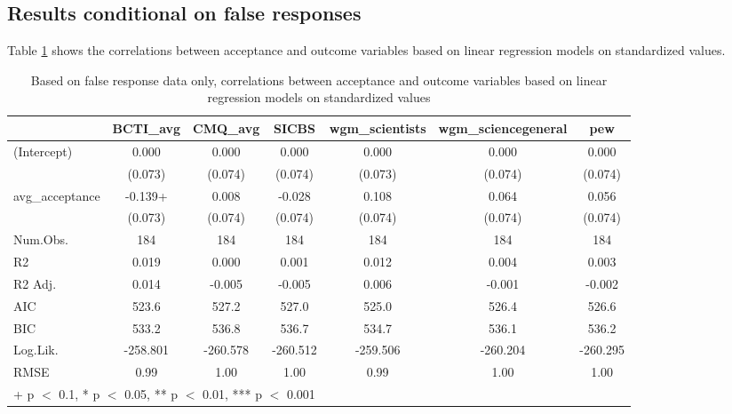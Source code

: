 \documentclass[
  doc,floatsintext]{apa6}
\begin{document}
\hypertarget{results-conditional-on-false-responses}{%
\subsection{Results conditional on false responses}\label{results-conditional-on-false-responses}}

Table \ref{tab:false-response-regression} shows the correlations between acceptance and outcome variables based on linear regression models on standardized values.

\begin{table}

\caption{\label{tab:false-response-regression}Based on false response data only, correlations between acceptance and outcome variables based on linear regression models on standardized values}
\centering
\begin{tabular}[t]{lcccccc}
\toprule
  & BCTI\_avg & CMQ\_avg & SICBS & wgm\_scientists & wgm\_sciencegeneral & pew\\
\midrule
(Intercept) & 0.000 & 0.000 & 0.000 & 0.000 & 0.000 & 0.000\\
 & (0.073) & (0.074) & (0.074) & (0.073) & (0.074) & (0.074)\\
avg\_acceptance & -0.139+ & 0.008 & -0.028 & 0.108 & 0.064 & 0.056\\
 & (0.073) & (0.074) & (0.074) & (0.074) & (0.074) & (0.074)\\
\midrule
Num.Obs. & 184 & 184 & 184 & 184 & 184 & 184\\
R2 & 0.019 & 0.000 & 0.001 & 0.012 & 0.004 & 0.003\\
R2 Adj. & 0.014 & -0.005 & -0.005 & 0.006 & -0.001 & -0.002\\
AIC & 523.6 & 527.2 & 527.0 & 525.0 & 526.4 & 526.6\\
BIC & 533.2 & 536.8 & 536.7 & 534.7 & 536.1 & 536.2\\
Log.Lik. & -258.801 & -260.578 & -260.512 & -259.506 & -260.204 & -260.295\\
RMSE & 0.99 & 1.00 & 1.00 & 0.99 & 1.00 & 1.00\\
\bottomrule
\multicolumn{7}{l}{\rule{0pt}{1em}+ p $<$ 0.1, * p $<$ 0.05, ** p $<$ 0.01, *** p $<$ 0.001}\\
\end{tabular}
\end{table}
\end{document}

